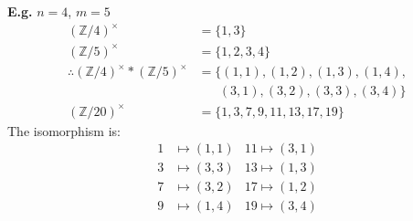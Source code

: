 \documentclass[11pt]{article}
\begin{document}
\textbf{E.g.} $n=4 $, $m=5$ 
\begin{align*}
	(\mathbb{Z}/4)^\times &= \{1,3\}\\
	(\mathbb{Z}/5)^\times &= \{1,2,3,4\}\\
	\therefore (\mathbb{Z}/4)^\times * (\mathbb{Z}/5)^\times &= \{ (1,1), (1,2), (1,3), (1,4),\\
	&\hspace{20pt} (3,1), (3,2), (3,3), (3,4)\}\\
	(\mathbb{Z}/20)^\times &= \{1,3,7,9,11,13,17,19\}
\end{align*}
The isomorphism is: 
\begin{align*}
	1&\mapsto(1,1)  &11\mapsto(3,1)\\
	3&\mapsto(3,3)  &13\mapsto(1,3)\\
	7&\mapsto(3,2)  &17\mapsto(1,2)\\
	9&\mapsto(1,4)  &19\mapsto(3,4)
\end{align*}
\end{document}
